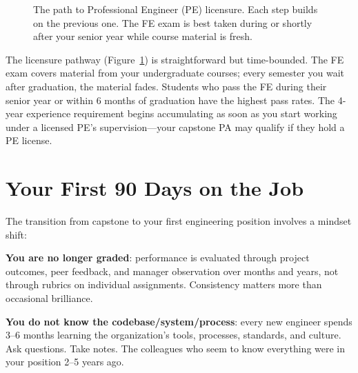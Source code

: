 \begin{figure}[htbp]
\centering
{}
\caption{The path to Professional Engineer (PE) licensure. Each step builds on the previous one. The FE exam is best taken during or shortly after your senior year while course material is fresh.}\label{fig:pe-path}
\end{figure}

The licensure pathway (Figure~\ref{fig:pe-path}) is straightforward but time-bounded. The FE exam covers material from your undergraduate courses; every semester you wait after graduation, the material fades. Students who pass the FE during their senior year or within 6 months of graduation have the highest pass rates. The 4-year experience requirement begins accumulating as soon as you start working under a licensed PE's supervision---your capstone PA may qualify if they hold a PE license.

\section{Your First 90 Days on the Job}
The transition from capstone to your first engineering position involves a mindset shift:

\textbf{You are no longer graded}: performance is evaluated through project outcomes, peer feedback, and manager observation over months and years, not through rubrics on individual assignments. Consistency matters more than occasional brilliance.

\textbf{You do not know the codebase/system/process}: every new engineer spends 3--6 months learning the organization's tools, processes, standards, and culture. Ask questions. Take notes. The colleagues who seem to know everything were in your position 2--5 years ago.

